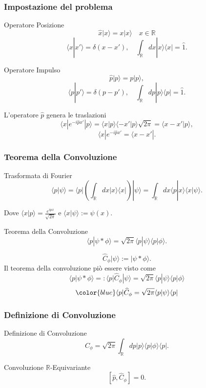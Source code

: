\documentclass[xcolor=dvipsnames]{beamer}
\newcommand{\R}{\mathbb{R}}
\begin{document}
\begin{frame}
    \frametitle{Impostazione del problema}
    \begin{block}{Operatore Posizione}
        \[ \widehat{x}|x\rangle = x | x \rangle \quad x \in \R \]
        \[ \langle x | x' \rangle = \delta(x-x'), \quad
    \int_{\R} dx | x \rangle \langle x | = \widehat{1} .\]
    \end{block}
    \begin{block}{Operatore Impulso}
    \[ \widehat{p} | p \rangle = p | p \rangle, \]
    \[ \langle p | p' \rangle = \delta(p-p'), \quad
    \int_{\R} dp | p \rangle \langle p | = \widehat{1} .\]
    \end{block}
    L'operatore $\widehat{p}$ genera le traslazioni
        \[ \langle x | e^{-i \widehat{p} x'} | p \rangle = \langle x | p \rangle \langle -x' | p \rangle \sqrt{2 \pi} = \langle x-x' | p \rangle, \]
        \[ \langle x | e^{-i \widehat{p} x'} = \langle x-x' | .  \]
\end{frame}

\begin{frame}
    \frametitle{Teorema della Convoluzione}
    \begin{block}{Trasformata di Fourier}
        \[ \langle p | \psi \rangle = \langle p | \left( \int_{\R} dx | x \rangle \langle x| \right) | \psi \rangle = 
         \int_{\R} dx \langle p | x \rangle \langle x | \psi \rangle. \]
    \end{block}
    Dove $\langle x | p \rangle = \frac{e^{ipx}}{\sqrt{2 \pi} }$ e $\langle x | \psi \rangle := \psi(x) $.
    \begin{block}{Teorema della Convoluzione}
        \[ \langle p | \psi * \phi \rangle = \sqrt{2\pi} \langle p | \psi \rangle \langle p | \phi \rangle . \]
    \end{block}
   \[ \widehat{C}_\phi | \psi \rangle  := | \psi * \phi \rangle . \]
    Il teorema della convoluzione piò essere visto come
    \[ \langle p | \psi * \phi \rangle =: \langle p | \widehat{C}_\phi |\psi \rangle = \sqrt{2\pi} \langle p | \psi \rangle \langle p | \phi \rangle \]
   \[ {\color{blue} \langle p | \widehat{C}_\phi = \sqrt{2\pi} \langle p | \psi \rangle \langle p | }\]
\end{frame}

\begin{frame}
    \frametitle{Definizione di Convoluzione}
    \begin{block}{Definizione di Convoluzione}
        \[ \widehat{C}_\phi = \sqrt{2\pi} \int_\R dp | p \rangle \langle p | \phi \rangle \langle p | . \]
    \end{block}
    \begin{block}{Convoluzione $\R$-Equivariante}
        \Large
        \[ [ \widehat{p}, \widehat{C}_\phi] = 0 .\]
    \end{block}
\end{frame}
\end{document}
